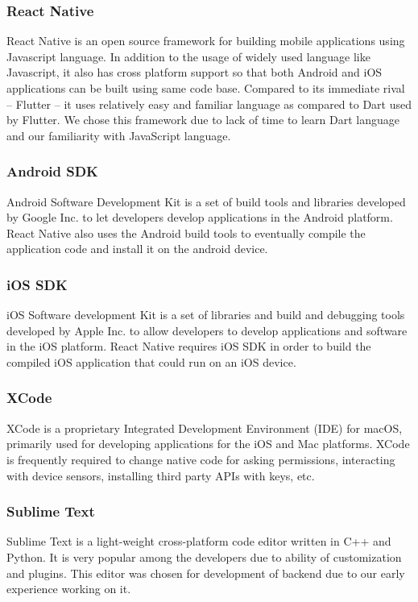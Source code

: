 \documentclass[12pt, a4paper, oneside]{article}
\begin{document}
\subsubsection{React Native}
React Native is an open source framework for building mobile applications using Javascript language. In addition to the usage of widely used language like Javascript, it also has cross platform support so that both Android and iOS applications can be built using same code base. Compared to its immediate rival -- Flutter -- it uses relatively easy and familiar language as compared to Dart used by Flutter. We chose this framework due to lack of time to learn Dart language and our familiarity with JavaScript language.

\subsubsection{Android SDK}
Android Software Development Kit is a set of build tools and libraries developed by Google Inc. to let developers develop applications in the Android platform. React Native also uses the Android build tools to eventually compile the application code and install it on the android device.

\subsubsection{iOS SDK}
iOS Software development Kit is a set of libraries and build and debugging tools developed by Apple Inc. to allow developers to develop applications and software in the iOS platform. React Native requires iOS SDK in order to build the compiled iOS application that could run on an iOS device.

\subsubsection{XCode}
XCode is a proprietary Integrated Development Environment (IDE) for macOS, primarily used for developing applications for the iOS and Mac platforms. XCode is frequently required to change native code for asking permissions, interacting with device sensors, installing third party APIs with keys, etc.

\subsubsection{Sublime Text}
Sublime Text is a light-weight cross-platform code editor written in C++ and Python. It is very popular among the developers due to ability of customization and plugins. This editor was chosen for development of backend due to our early experience working on it.
\end{document}
